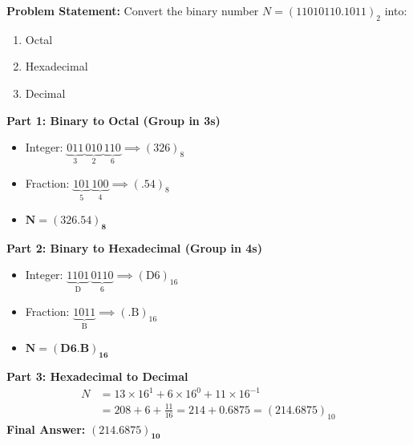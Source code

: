 \begin{example}
\textbf{Problem Statement:} Convert the binary number $N = (11010110.1011)_2$ into:
\begin{enumerate}
    \item Octal
    \item Hexadecimal
    \item Decimal
\end{enumerate}

\tcblower
\textbf{Part 1: Binary to Octal (Group in 3s)}
\begin{itemize}
    \item Integer: $\underbrace{011}_{3} \, \underbrace{010}_{2} \, \underbrace{110}_{6} \implies (326)_8$
    \item Fraction: $\underbrace{101}_{5} \, \underbrace{100}_{4} \implies (.54)_8$
    \item $\mathbf{N = (326.54)_8}$
\end{itemize}

\textbf{Part 2: Binary to Hexadecimal (Group in 4s)}
\begin{itemize}
    \item Integer: $\underbrace{1101}_{\text{D}} \, \underbrace{0110}_{6} \implies (\text{D}6)_{16}$
    \item Fraction: $\underbrace{1011}_{\text{B}} \implies (.\text{B})_{16}$
    \item $\mathbf{N = (\text{D}6.\text{B})_{16}}$
\end{itemize}

\textbf{Part 3: Hexadecimal to Decimal}
\begin{align*}
    N &= 13 \times 16^1 + 6 \times 16^0 + 11 \times 16^{-1} \\
      &= 208 + 6 + \frac{11}{16} = 214 + 0.6875 = (214.6875)_{10}
\end{align*}
\textbf{Final Answer:} $\mathbf{(214.6875)_{10}}$
\end{example}

